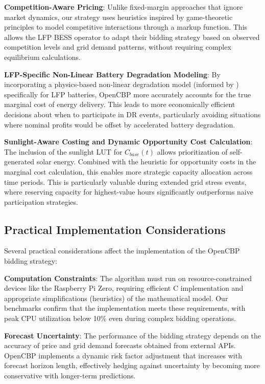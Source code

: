 \documentclass[11pt,a4paper]{article}
\begin{document}
\textbf{Competition-Aware Pricing}: Unlike fixed-margin approaches that ignore market dynamics, our strategy uses heuristics inspired by game-theoretic principles to model competitive interactions through a markup function. This allows the LFP BESS operator to adapt their bidding strategy based on observed competition levels and grid demand patterns, without requiring complex equilibrium calculations.

\textbf{LFP-Specific Non-Linear Battery Degradation Modeling}: By incorporating a physics-based non-linear degradation model (informed by \citet{Millner2010}) specifically for LFP batteries, OpenCBP more accurately accounts for the true marginal cost of energy delivery. This leads to more economically efficient decisions about when to participate in DR events, particularly avoiding situations where nominal profits would be offset by accelerated battery degradation.

\textbf{Sunlight-Aware Costing and Dynamic Opportunity Cost Calculation}: The inclusion of the sunlight LUT for $C_{base}(t)$ allows prioritization of self-generated solar energy. Combined with the heuristic for opportunity costs in the marginal cost calculation, this enables more strategic capacity allocation across time periods. This is particularly valuable during extended grid stress events, where reserving capacity for highest-value hours significantly outperforms naive participation strategies.

\subsection{Practical Implementation Considerations}
Several practical considerations affect the implementation of the OpenCBP bidding strategy:

\textbf{Computation Constraints}: The algorithm must run on resource-constrained devices like the Raspberry Pi Zero, requiring efficient C implementation and appropriate simplifications (heuristics) of the mathematical model. Our benchmarks confirm that the implementation meets these requirements, with peak CPU utilization below 10\% even during complex bidding operations.

\textbf{Forecast Uncertainty}: The performance of the bidding strategy depends on the accuracy of price and grid demand forecasts obtained from external APIs. OpenCBP implements a dynamic risk factor adjustment that increases with forecast horizon length, effectively hedging against uncertainty by becoming more conservative with longer-term predictions.
\end{document}
